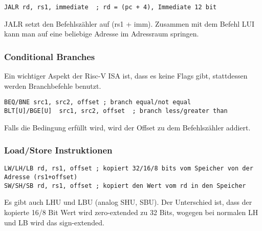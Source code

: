 \begin{lstlisting}
JALR rd, rs1, immediate  ; rd = (pc + 4), Immediate 12 bit
\end{lstlisting}

JALR setzt den Befehlszähler auf (rs1 + imm). Zusammen mit dem Befehl LUI kann
man auf eine beliebige Adresse im Adressraum springen.

\subsubsection{Conditional Branches}

Ein wichtiger Aspekt der Risc-V ISA ist, dass es keine Flags gibt, stattdessen
werden Branchbefehle benutzt.

\begin{lstlisting}
BEQ/BNE src1, src2, offset ; branch equal/not equal
BLT[U]/BGE[U]  src1, src2, offset  ; branch less/greater than
\end{lstlisting}

Falls die Bedingung erfüllt wird, wird der Offset zu dem Befehlszähler addiert.

\subsubsection{Load/Store Instruktionen}

\begin{lstlisting}
LW/LH/LB rd, rs1, offset ; kopiert 32/16/8 bits vom Speicher von der Adresse (rs1+offset)
SW/SH/SB rd, rs1, offset ; kopiert den Wert vom rd in den Speicher
\end{lstlisting}

Es gibt auch LHU und LBU (analog SHU, SBU). Der Unterschied ist, dass der
kopierte 16/8 Bit Wert wird zero-extended zu 32 Bits, wogegen bei normalen LH
und LB wird das sign-extended.